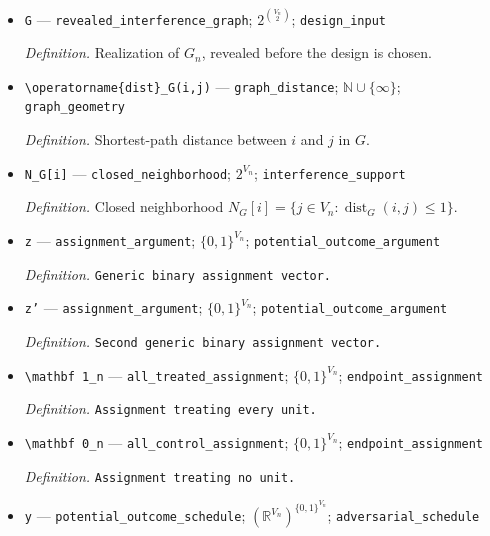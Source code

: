 \documentclass{article}
\begin{document}
\begin{itemize}
  \par\smallskip\noindent\emph{Definition.} Uniformly drawn labeled simple \(d_n\)-regular graph on \(V_n\).
  \item \texttt{G} --- \texttt{revealed\_\allowbreak{}interference\_\allowbreak{}graph}; \(2^{\binom{V_n}{2}}\); \texttt{design\_\allowbreak{}input}
  \par\smallskip\noindent\emph{Definition.} Realization of \(G_n\), revealed before the design is chosen.
  \item \texttt{\textbackslash{}\allowbreak{}operatorname\{dist\}\allowbreak{}\_\allowbreak{}G(i,\allowbreak{}j)} --- \texttt{graph\_\allowbreak{}distance}; \(\mathbb N\cup\{\infty\}\); \texttt{graph\_\allowbreak{}geometry}
  \par\smallskip\noindent\emph{Definition.} Shortest-path distance between \(i\) and \(j\) in \(G\).
  \item \texttt{N\_\allowbreak{}G[i]} --- \texttt{closed\_\allowbreak{}neighborhood}; \(2^{V_n}\); \texttt{interference\_\allowbreak{}support}
  \par\smallskip\noindent\emph{Definition.} Closed neighborhood \(N_G[i]=\{j\in V_n:\operatorname{dist}_G(i,j)\le 1\}\).
  \item \texttt{z} --- \texttt{assignment\_\allowbreak{}argument}; \(\{0,1\}^{V_n}\); \texttt{potential\_\allowbreak{}outcome\_\allowbreak{}argument}
  \par\smallskip\noindent\emph{Definition.} \texttt{Generic binary assignment vector.}
  \item \texttt{z'} --- \texttt{assignment\_\allowbreak{}argument}; \(\{0,1\}^{V_n}\); \texttt{potential\_\allowbreak{}outcome\_\allowbreak{}argument}
  \par\smallskip\noindent\emph{Definition.} \texttt{Second generic binary assignment vector.}
  \item \texttt{\textbackslash{}\allowbreak{}mathbf 1\_\allowbreak{}n} --- \texttt{all\_\allowbreak{}treated\_\allowbreak{}assignment}; \(\{0,1\}^{V_n}\); \texttt{endpoint\_\allowbreak{}assignment}
  \par\smallskip\noindent\emph{Definition.} \texttt{Assignment treating every unit.}
  \item \texttt{\textbackslash{}\allowbreak{}mathbf 0\_\allowbreak{}n} --- \texttt{all\_\allowbreak{}control\_\allowbreak{}assignment}; \(\{0,1\}^{V_n}\); \texttt{endpoint\_\allowbreak{}assignment}
  \par\smallskip\noindent\emph{Definition.} \texttt{Assignment treating no unit.}
  \item \texttt{y} --- \texttt{potential\_\allowbreak{}outcome\_\allowbreak{}schedule}; \((\mathbb R^{V_n})^{\{0,1\}^{V_n}}\); \texttt{adversarial\_\allowbreak{}schedule}

\end{itemize}
\end{document}
